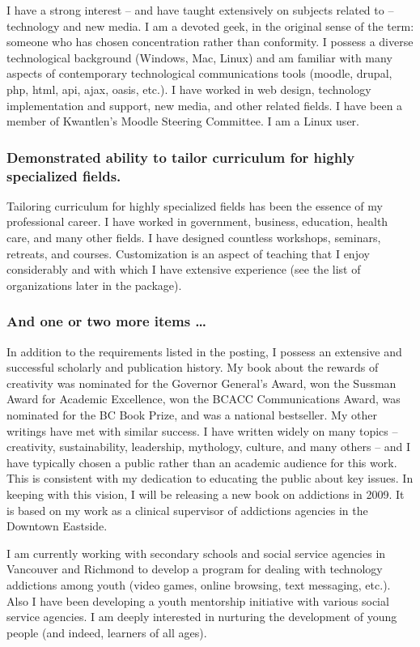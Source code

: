 \documentclass[10pt,DIV09,letterpaper,oneside,headsepline]{scrreprt}
\begin{document}
I have a strong interest -- and have taught extensively on subjects related to -- technology and new media. I am a devoted geek, in the original sense of the term: someone who has chosen concentration rather than conformity. I possess a diverse technological background (Windows, Mac, Linux) and am familiar with many aspects of contemporary technological communications tools (moodle, drupal, php, html, api, ajax, oasis, etc.). I have worked in web design, technology implementation and support, new media, and other related fields. I have been a member of Kwantlen's Moodle Steering Committee. I am a Linux user.

\subsubsection{Demonstrated ability to tailor curriculum for highly specialized fields.}

Tailoring curriculum for highly specialized fields has been the essence of my professional career. I have worked in government, business, education, health care, and many other fields. I have designed countless workshops, seminars, retreats, and courses. Customization is an aspect of teaching that I enjoy considerably and with which I have extensive experience (see the list of organizations later in the package).

\subsubsection{And one or two more items \ldots}
In addition to the requirements listed in the posting, I possess an extensive and successful scholarly and publication history. My book about the rewards of creativity was nominated for the Governor General's Award, won the Sussman Award for Academic Excellence, won the BCACC Communications Award, was nominated for the BC Book Prize, and was a national bestseller. My other writings have met with similar success. I have written widely on many topics -- creativity, sustainability, leadership, mythology, culture, and many others -- and I have typically chosen a public rather than an academic audience for this work. This is consistent with my dedication to educating the public about key issues. In keeping with this vision, I will be releasing a new book on addictions in 2009. It is based on my work as a clinical supervisor of addictions agencies in the Downtown Eastside.

I am currently working with secondary schools and social service agencies in Vancouver and Richmond to develop a program for dealing with technology addictions among youth (video games, online browsing, text messaging, etc.). Also I have been developing a youth mentorship initiative with various social service agencies. I am deeply interested in nurturing the development of young people (and indeed, learners of all ages). 
\end{document}
